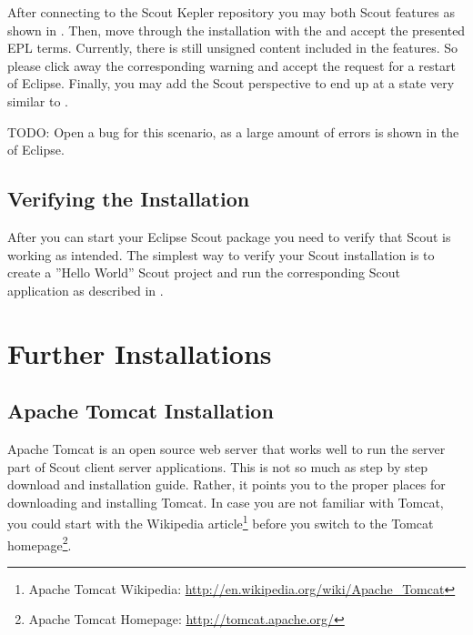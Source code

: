 \documentclass[a4paper,10pt,twoside]{book}
\begin{document}
After connecting to the Scout Kepler repository you may both Scout features as shown in .
Then, move through the installation with the  and accept the presented EPL terms.
Currently, there is still unsigned content included in the features.
So please click away the corresponding warning and accept the request for a restart of Eclipse.
Finally, you may add the Scout perspective to end up at a state very similar to .

TODO: Open a bug for this scenario, as a large amount of errors is shown in the  of Eclipse.


\section{Verifying the Installation}

After you can start your Eclipse Scout package you need to verify that Scout is working as intended.
The simplest way to verify your Scout installation is to create a ''Hello World'' Scout project and run the corresponding Scout application as described in .

\chapter{Further Installations}

\section{Apache Tomcat Installation}

Apache Tomcat is an open source web server that works well to run the server part of Scout client server applications.
This is not so much as step by step download and installation guide. 
Rather, it points you to the proper places for downloading and installing Tomcat.
In case you are not familiar with Tomcat, you could start with the Wikipedia article\footnote{
Apache Tomcat Wikipedia: \url{http://en.wikipedia.org/wiki/Apache_Tomcat}
}
before you switch to the Tomcat homepage\footnote{
Apache Tomcat Homepage: \url{http://tomcat.apache.org/}
}.
\end{document}
